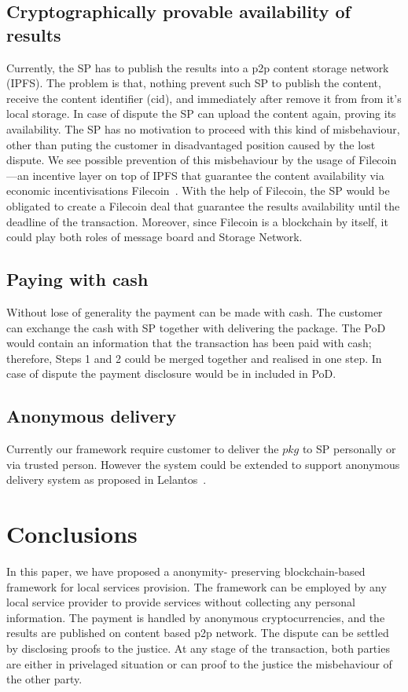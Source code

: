 \documentclass{ieeeaccess}
\begin{document}
\subsection{Cryptographically provable availability of
results}\label{cryptographically-provable-availability-of-results}

Currently, the SP has to publish the results into a p2p content storage
network (IPFS). The problem is that, nothing prevent such SP to publish
the content, receive the content identifier (cid), and immediately after
remove it from from it's local storage. In case of dispute the SP can
upload the content again, proving its availability. The SP has no
motivation to proceed with this kind of misbehaviour, other than puting
the customer in disadvantaged position caused by the lost dispute. We see
possible prevention of this misbehaviour by the usage of Filecoin---an
incentive layer on top of IPFS that guarantee the content availability
via economic incentivisations Filecoin~\cite{benetfilecoin}. With the
help of Filecoin, the SP would be obligated to create a Filecoin deal
that guarantee the results availability until the deadline of the
transaction. Moreover, since Filecoin is a blockchain by itself, it
could play both roles of message board and Storage Network.

\subsection{Paying with cash}\label{paying-with-cash}

Without lose of generality the payment can be made with cash. The
customer can exchange the cash with SP together with delivering the
package. The PoD would contain an information that the
transaction has been paid with cash; therefore, Steps 1 and 2 could be
merged together and realised in one step. In case of dispute the payment
disclosure would be in included in PoD.

\subsection{Anonymous delivery}\label{anonymous-delivery}

Currently our framework require customer to deliver the \(pkg\) to SP
personally or via trusted person. However the system could be extended
to support anonymous delivery system as proposed in
Lelantos~\cite{altawy2017lelantos}.

\section{Conclusions}
In this paper, we have proposed a anonymity- preserving blockchain-based framework for local services provision. The framework can be employed by any local service provider to provide services without collecting any personal information. The payment is handled by anonymous cryptocurrencies, and the results are published on content based p2p network. The dispute can be settled by disclosing proofs to the justice. At any stage of the transaction, both parties are either in privelaged situation or can proof to the justice the misbehaviour of the other party.



\EOD
\end{document}
